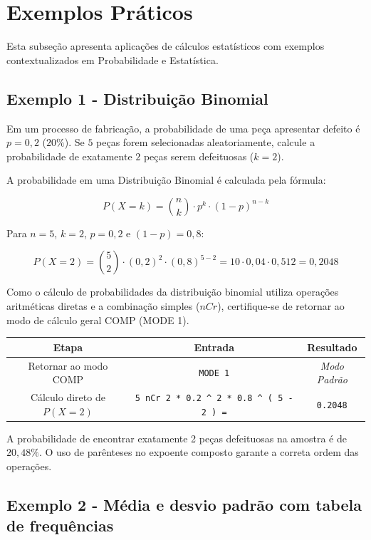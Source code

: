 \section{Exemplos Práticos}

Esta subseção apresenta aplicações de cálculos estatísticos com exemplos contextualizados em Probabilidade e Estatística.

\subsection*{Exemplo 1 - Distribuição Binomial}

Em um processo de fabricação, a probabilidade de uma peça apresentar defeito é $p = 0{,}2$ ($20\%$). Se $5$ peças forem selecionadas aleatoriamente, calcule a probabilidade de exatamente $2$ peças serem defeituosas ($k = 2$).

A probabilidade em uma Distribuição Binomial é calculada pela fórmula:

\[
    P(X = k) = \binom{n}{k} \cdot p^k \cdot (1-p)^{n-k}
\]

Para $n = 5$, $k = 2$, $p = 0{,}2$ e $(1-p) = 0{,}8$:

\[
    P(X = 2) = \binom{5}{2} \cdot (0{,}2)^2 \cdot (0{,}8)^{5-2} = 10 \cdot 0{,}04 \cdot 0{,}512 = 0{,}2048
\]

Como o cálculo de probabilidades da distribuição binomial utiliza operações aritméticas diretas e a combinação simples ($nCr$), certifique-se de retornar ao modo de cálculo geral COMP (MODE 1).

\begin{table}[H]
    \centering
    \begin{tabular}{|c|c|c|}
        \hline
        \textbf{Etapa} & \textbf{Entrada} & \textbf{Resultado} \\ \hline
        Retornar ao modo COMP & \texttt{MODE 1} & \textit{Modo Padrão} \\
        Cálculo direto de $P(X=2)$ & \texttt{5 nCr 2 * 0.2 \^{} 2 * 0.8 \^{} ( 5 - 2 ) =} & \texttt{0.2048} \\ \hline
    \end{tabular}
\end{table}

A probabilidade de encontrar exatamente 2 peças defeituosas na amostra é de $20{,}48\%$. O uso de parênteses no expoente composto garante a correta ordem das operações.

\subsection*{Exemplo 2 - Média e desvio padrão com tabela de frequências}

